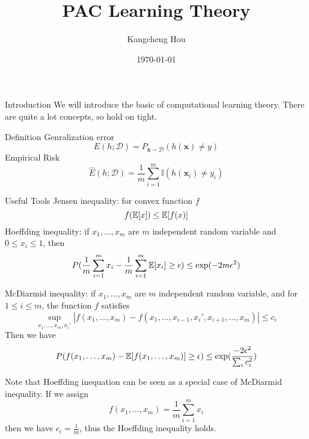 \documentclass{beamer}
\title{PAC Learning Theory}
\author{Kangcheng Hou}
\institute{Zhejiang University}
\date{\today}
\newcommand{\D}{\mathcal{D}}
\newcommand{\x}{\mathbf{x}}
\begin{document}
    
\frame{\titlepage}

\begin{frame}{Introduction}
We will introduce the basic of computational learning theory. There are quite a lot concepts, so hold on tight.
\end{frame}


\begin{frame}[allowframebreaks]{Definition}
Genralization error
$$E(h;\D) = P_{\x \sim \D}(h(\x) \neq y)$$
Empirical Risk
$$\hat{E}(h; \D) = \frac{1}{m}\sum_{i=1}^m \mathbb{I}(h(\x_i) \neq y_i )$$
\end{frame}

\begin{frame}[allowframebreaks]{Useful Tools}
Jensen inequality: for convex function $f$
$$f(\mathbb{E}[x]) \le \mathbb{E}[f(x)]$$
Hoeffding inequality: if $x_1, \dots, x_m$ are $m$ independent random variable and $0\le x_i \le 1$, then
$$P(\frac{1}{m}\sum_{i=1}^m x_i - \frac{1}{m} \sum_{i=1}^m \mathbb{E}[x_i] \ge \epsilon) \le \exp(-2m\epsilon^2)$$


McDiarmid inequality: if $x_1, \dots, x_m$ are $m$ independent random variable, and for $1 \le i \le m$, the function $f$ satisfies 
$$\sup_{x_1, \dots, x_m, x_i'} |f(x_1, \dots, x_m) - f(x_1, \dots, x_{i-1}, x_i', x_{i+1}, \dots, x_m)| \le c_i$$
Then we have 
$$P( f(x_1, \dots, x_m) - \mathbb{E}[f(x_1, \dots, x_m)] \ge \epsilon) \le \exp(\frac{-2\epsilon^2}{\sum_i c_i^2})$$

Note that Hoeffding inequation can be seen as a special case of McDiarmid inequality. If we assign $$f(x_1, \dots, x_m) = \frac{1}{m} \sum_{i=1}^m x_i$$ then we have $c_i = \frac{1}{m}$, thus the Hoeffding inequality holds.

\end{frame}
\end{document}
